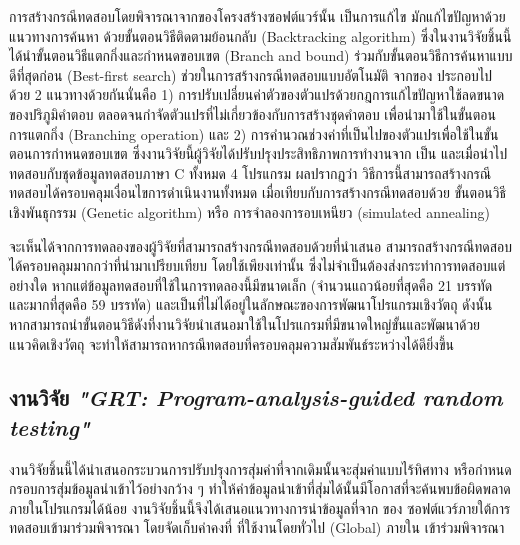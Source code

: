 การสร้างกรณีทดสอบโดยพิจารณาจาก{\Path}ของโครงสร้างซอฟต์แวร์นั้น เป็นการแก้ไข\FirstTimeDefine{\csp}{\cspEN} มักแก้ไขปัญหาด้วยแนวทางการค้นหา
ด้วยขั้นตอนวิธีติดตามย้อนกลับ (Backtracking algorithm) ซึ่งในงานวิจัยชิ้นนี้ได้นำขั้นตอนวิธีแตกกิ่งและกำหนดขอบเขต (Branch and bound) 
ร่วมกับขั้นตอนวิธีการค้นหาแบบดีที่สุดก่อน (Best-first search) ช่วยในการสร้างกรณีทดสอบแบบอัตโนมัติ จาก{\StaticInformation}ของ{\sourcecode} 
ประกอบไปด้วย 2 แนวทางด้วยกันนั่นคือ 
1) การปรับเปลี่ยนค่าตัวของตัวแปรด้วยกฎการแก้ไขปัญหาใช้ลดขนาดของปริภูมิคำตอบ ตลอดจนกำจัดตัวแปรที่ไม่เกี่ยวข้องกับการสร้างชุดคำตอบ 
เพื่อนำมาใช้ในขั้นตอนการแตกกิ่ง (Branching operation) และ 2) การคำนวณช่วงค่าที่เป็นไปของตัวแปรเพื่อใช้ในขั้นตอนการกำหนดขอบเขต
ซึ่งงานวิจัยนี้ผู้วิจัยได้ปรับปรุงประสิทธิภาพการทำงานจาก  เป็น  และเมื่อนำไปทดสอบกับชุดข้อมูลทดสอบภาษา C ทั้งหมด 4 โปรแกรม
ผลปรากฎว่า วิธีการนี้สามารถสร้างกรณีทดสอบได้ครอบคลุมเงื่อนไขการดำเนินงานทั้งหมด เมื่อเทียบกับการสร้างกรณีทดสอบด้วย ขั้นตอนวิธีเชิงพันธุกรรม (Genetic algorithm)
หรือ การจำลองการอบเหนียว (simulated annealing) %

จะเห็นได้จากการทดลองของผู้วิจัยที่สามารถสร้างกรณีทดสอบด้วย{\Algorithm}ที่นำเสนอ สามารถสร้างกรณีทดสอบได้ครอบคลุมมากกว่า{\Algorithm}ที่นำมาเปรียบเทียบ 
โดยใช้เพียง{\StaticInformation}เท่านั้น ซึ่งไม่จำเป็นต้องส่งกระทำการทดสอบ{\sourcecode}แต่อย่างใด หากแต่ข้อมูลทดสอบที่ใช้ในการทดลองนี้มีขนาดเล็ก 
(จำนวนแถวน้อยที่สุดคือ 21 บรรทัด และมากที่สุดคือ 59 บรรทัด) และเป็น{\sourcecode}ที่ไม่ได้อยู่ในลักษณะของการพัฒนาโปรแกรมเชิงวัตถุ 
ดังนั้นหากสามารถนำขั้นตอนวิธีดังที่งานวิจัยนำเสนอมาใช้ในโปรแกรมที่มีขนาดใหญ่ขั้นและพัฒนาด้วยแนวคิดเชิงวัตถุ 
จะทำให้สามารถหากรณีทดสอบที่ครอบคลุมความสัมพันธ์ระหว่าง{\softwareComponent}ได้ดียิ่งขึ้น

\subsection{งานวิจัย {\it "GRT: Program-analysis-guided random testing"} \cite{Ma2016}}
\label{sec:sub:grt}

งานวิจัยชิ้นนี้ได้นำเสนอกระบวนการปรับปรุงการสุ่มค่าที่จากเดิมนั้นจะสุ่มค่าแบบไร้ทิศทาง หรือกำหนดกรอบการสุ่มข้อมูลนำเข้าไว้อย่างกว้าง ๆ 
ทำให้ค่าข้อมูลนำเข้าที่สุ่มได้นั้นมีโอกาสที่จะค้นพบข้อผิดพลาดภายในโปรแกรมได้น้อย งานวิจัยชิ้นนี้จึงได้เสนอแนวทางการนำข้อมูลที่จาก{\sourcecode} ของ
ซอฟต์แวร์ภายใต้การทดสอบเข้ามาร่วมพิจารณา โดยจัดเก็บค่าคงที่ ที่ใช้งานโดยทั่วไป (Global) ภายใน{\sourcecode} เข้าร่วมพิจารณา 

